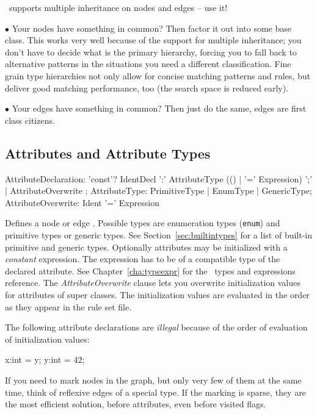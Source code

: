 \begin{note}
\GrG~supports multiple inheritance on nodes and edges -- use it!

$\bullet$ Your nodes have something in common?
Then factor it out into some base class.
This works very well because of the support for multiple inheritance; you don't have to decide what is the primary hierarchy, forcing you to fall back to alternative patterns in the situations you need a different classification.
Fine grain type hierarchies not only allow for concise matching patterns and rules,
but deliver good matching performance, too (the search space is reduced early).

$\bullet$ Your edges have something in common?
Then just do the same, edges are first class citizens.
\end{note}

\subsection{Attributes and Attribute Types}
\label{sct:attrtypes}

\begin{rail}
  AttributeDeclaration: 'const'? IdentDecl ':' AttributeType (() | '=' Expression) ';' | AttributeOverwrite ;
  AttributeType: PrimitiveType | EnumType | GenericType;
  AttributeOverwrite: Ident '=' Expression
\end{rail}
Defines a node or edge .
Possible types are enumeration types (\texttt{enum}) and primitive types or generic types.
See Section~\ref{sec:builtintypes} for a list of built-in primitive and generic types.
Optionally attributes may be initialized with a \emph{constant} expression.
The expression has to be of a compatible type of the declared attribute.
See Chapter~\ref{cha:typeexpr} for the \GrG\ types and expressions reference.
The \emph{AttributeOverwrite} clause lets you overwrite initialization values for attributes of super classes.
The initialization values are evaluated in the order as they appear in the rule set file.
\begin{warning}
	The following attribute declarations are \emph{illegal} because of the order of evaluation of initialization values:
	\begin{grgen}
x:int = y;
y:int = 42;
	\end{grgen}
\end{warning}

\begin{note}
If you need to mark nodes in the graph, but only very few of them at the same time, think of reflexive edges of a special type. If the marking is sparse, they are the most efficient solution, before attributes, even before visited flags.
\end{note}



